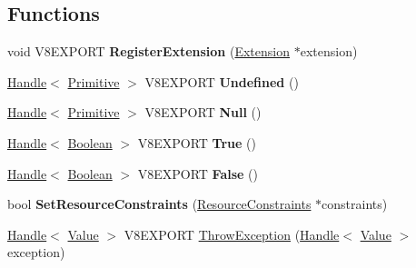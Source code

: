 \subsection*{Functions}
\begin{DoxyCompactItemize}
\item 
\hypertarget{namespacev8_a7cbab71dcaa41657f6784aa76d01b8f6}{}void V8\+E\+X\+P\+O\+R\+T {\bfseries Register\+Extension} (\hyperlink{classv8_1_1_extension}{Extension} $\ast$extension)\label{namespacev8_a7cbab71dcaa41657f6784aa76d01b8f6}

\item 
\hypertarget{namespacev8_ad39cfade81e77137fc11ff3a24284340}{}\hyperlink{classv8_1_1_handle}{Handle}$<$ \hyperlink{classv8_1_1_primitive}{Primitive} $>$ V8\+E\+X\+P\+O\+R\+T {\bfseries Undefined} ()\label{namespacev8_ad39cfade81e77137fc11ff3a24284340}

\item 
\hypertarget{namespacev8_aa6bb9749edb4ef25314964762bc4d5e8}{}\hyperlink{classv8_1_1_handle}{Handle}$<$ \hyperlink{classv8_1_1_primitive}{Primitive} $>$ V8\+E\+X\+P\+O\+R\+T {\bfseries Null} ()\label{namespacev8_aa6bb9749edb4ef25314964762bc4d5e8}

\item 
\hypertarget{namespacev8_a9201601bde0d0b9bd26e474d841e2710}{}\hyperlink{classv8_1_1_handle}{Handle}$<$ \hyperlink{classv8_1_1_boolean}{Boolean} $>$ V8\+E\+X\+P\+O\+R\+T {\bfseries True} ()\label{namespacev8_a9201601bde0d0b9bd26e474d841e2710}

\item 
\hypertarget{namespacev8_a06ef84e71fefe9af11b127b632bb7527}{}\hyperlink{classv8_1_1_handle}{Handle}$<$ \hyperlink{classv8_1_1_boolean}{Boolean} $>$ V8\+E\+X\+P\+O\+R\+T {\bfseries False} ()\label{namespacev8_a06ef84e71fefe9af11b127b632bb7527}

\item 
\hypertarget{namespacev8_a022c46100a976b754201ce8ffadff5d2}{}bool {\bfseries Set\+Resource\+Constraints} (\hyperlink{classv8_1_1_resource_constraints}{Resource\+Constraints} $\ast$constraints)\label{namespacev8_a022c46100a976b754201ce8ffadff5d2}

\item 
\hyperlink{classv8_1_1_handle}{Handle}$<$ \hyperlink{classv8_1_1_value}{Value} $>$ V8\+E\+X\+P\+O\+R\+T \hyperlink{namespacev8_a2469af0ac719d39f77f20cf68dd9200e}{Throw\+Exception} (\hyperlink{classv8_1_1_handle}{Handle}$<$ \hyperlink{classv8_1_1_value}{Value} $>$ exception)
\end{DoxyCompactItemize}


